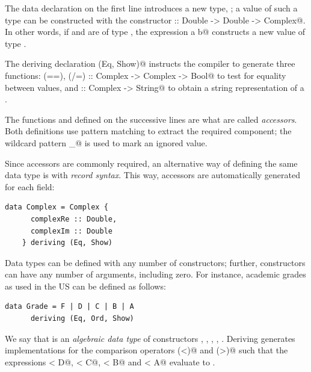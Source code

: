 \documentclass[UdineBachThesis,american,11pt]{PhdThesis}
\begin{document}
  The data declaration on the first line introduces a new type,
  \lstinline@Complex@; a value of such a type can be constructed with the
  constructor \lstinline@Complex :: Double -> Double -> Complex@. In other
  words, if \lstinline@a@ and \lstinline@b@ are of type \lstinline@Double@, the
  expression \lstinline@Complex a b@ constructs a new value of type
  \lstinline@Complex@.

  \pagebreak

  The deriving declaration \lstinline@deriving (Eq, Show)@ instructs the
  compiler to generate three functions:
  \lstinline@(==), (/=) :: Complex -> Complex -> Bool@ to test for equality
  between values, and \lstinline@show :: Complex -> String@ to obtain a string
  representation of a \lstinline@Complex@.

  The functions \lstinline@complexRe@ and \lstinline@complexIm@ defined on the
  successive lines are what are called \emph{accessors}. Both definitions use
  pattern matching to extract the required component; the wildcard pattern
  \lstinline@_@ is used to mark an ignored value.

  Since accessors are commonly required, an alternative way of defining the same
  data type is with \emph{record syntax}. This way, accessors are automatically
  generated for each field:

  \begin{lstlisting}[gobble=4,basicstyle=\ttfamily\small]
    data Complex = Complex {
      complexRe :: Double,
      complexIm :: Double
    } deriving (Eq, Show)
  \end{lstlisting}

  Data types can be defined with any number of constructors; further,
  constructors can have any number of arguments, including zero. For instance,
  academic grades as used in the US can be defined as follows:

  \begin{lstlisting}[gobble=4,basicstyle=\ttfamily\small]
    data Grade = F | D | C | B | A
      deriving (Eq, Ord, Show)
  \end{lstlisting}

  We say that \lstinline@Grade@ is an \emph{algebraic data type} of constructors
  \lstinline@F@, \lstinline@D@, \lstinline@C@, \lstinline@B@, \lstinline@A@.
  Deriving \lstinline@Ord@ generates implementations for the comparison
  operators \lstinline@(<)@ and \lstinline@(>)@ such that the expressions
  \lstinline@F < D@, \lstinline@D < C@, \lstinline@C < B@ and \lstinline@B < A@
  evaluate to \lstinline@True@.
\end{document}
